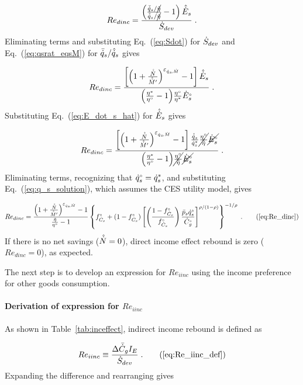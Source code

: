 \begin{equation}
  Re_{dinc} = \frac{\left( \frac{\bar{\dot{q}}_s / \cancel{\tilde{\eta}}}{\hat{\dot{q}}_s / \cancel{\tilde{\eta}}} - 1  \right) \hat{\dot{E}}_s}
              {\dot{S}_{dev}} \; .
\end{equation}
%
Eliminating terms and substituting Eq.~(\ref{eq:Sdot}) for $\dot{S}_{dev}$ and
Eq.~(\ref{eq:qsrat_eqsM}) for $\bar{\dot{q}}_s / \hat{\dot{q}}_s$ gives

\begin{equation}
  Re_{dinc} = \frac{\left[ \left( 1 + \frac{\hat{\dot{N}}}{\hat{\dot{M}}^\prime} \right) ^{\varepsilon_{\dot{q}_s\!,\dot{M}}} - 1  \right] \hat{\dot{E}}_s}
              {\left( \frac{{\eta}^*}{{}{\eta}^{\scriptscriptstyle \circ}} - 1 \right)\! \frac{{}{\eta}^{\scriptscriptstyle \circ}}{{\eta}^*} {}{\dot{E}}^{\scriptscriptstyle \circ}_s} \; .
\end{equation}
%
Substituting Eq.~(\ref{eq:E_dot_s_hat}) for $\hat{\dot{E}}_s$ gives

\begin{equation}
  Re_{dinc} = \frac{\left[ \left( 1 + \frac{\hat{\dot{N}}}{\hat{\dot{M}}^\prime} \right) ^{\varepsilon_{\dot{q}_s\!,\dot{M}}} - 1  \right]
                  \frac{\hat{\dot{q}}_s}{{\dot{q}}^*_s}
                \cancel{\frac{{}{\eta}^{\scriptscriptstyle \circ}}{\tilde{\eta}}}
                \cancel{{}{\dot{E}}^{\scriptscriptstyle \circ}_s}}
              {\left( \frac{{\eta}^*}{{}{\eta}^{\scriptscriptstyle \circ}} - 1 \right)\!
                  \cancel{\frac{{}{\eta}^{\scriptscriptstyle \circ}}{\tilde{\eta}}} \cancel{{}{\dot{E}}^{\scriptscriptstyle \circ}_s}} \; .
\end{equation}
%
Eliminating terms, recognizing that
${}{\dot{q}}^{\scriptscriptstyle \circ}_s = {\dot{q}}^*_s$, and substituting Eq.~(\ref{eq:q_s_solution}),
which assumes the CES utility model,
gives

\begin{equation}
  Re_{dinc} = \Redinceqnexact{} \; . \tag{\ref{eq:Re_dinc}}
\end{equation}
%
If there is no net savings ($\hat{\dot{N}} = 0$),
direct income effect rebound is zero ($Re_{dinc} = 0$), as expected.

The next step is to develop an expression for $Re_{iinc}$
using the income preference for other goods consumption.


\paragraph{Derivation of expression for $Re_{iinc}$}
\label{sec:Re_iinc}

As shown in Table~\ref{tab:inceffect}, indirect income rebound is defined as

\begin{equation}
  Re_{iinc} \equiv \frac{\Delta \rainc{C}_g I_E}{\Sdot} \; . \tag{\ref{eq:Re_iinc_def}}
\end{equation}
%
Expanding the difference and rearranging gives

